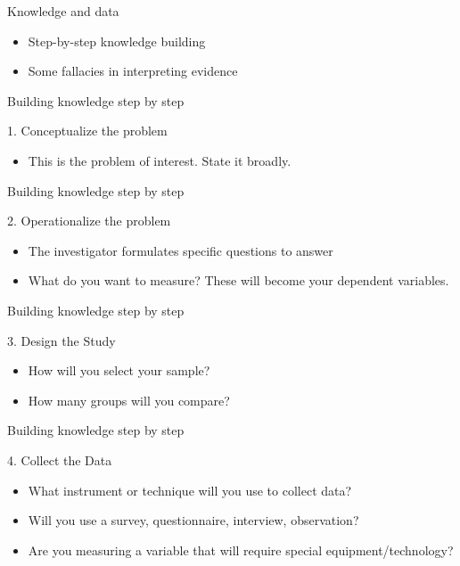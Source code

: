 \documentclass[14pt]{beamer}\usepackage[]{graphicx}\usepackage[]{color}
\begin{document}
\begin{frame}[fragile]{Knowledge and data}

\begin{itemize}
\item Step-by-step knowledge building
\item Some fallacies in interpreting evidence
\end{itemize}
\end{frame}

\begin{frame}[fragile]{Building knowledge step by step}

1. Conceptualize the problem

\begin{itemize}
\item This is the problem of interest.  State it broadly.
\end{itemize}
\end{frame}

\begin{frame}[fragile]{Building knowledge step by step}

2. Operationalize the problem

\begin{itemize}
\item The investigator formulates specific questions to answer
\item What do you want to measure?  These will become your dependent variables.
\end{itemize}
\end{frame}

\begin{frame}[fragile]{Building knowledge step by step}

3. Design the Study

\begin{itemize}
\item How will you select your sample?
\item How many groups will you compare?
\end{itemize}
\end{frame}

\begin{frame}[fragile]{Building knowledge step by step}

4. Collect the Data

\begin{itemize}
\item What instrument or technique will you use to collect data?
\item Will you use a survey, questionnaire, interview, observation?
\item Are you measuring a variable that will require special equipment/technology?
\end{itemize}
\end{frame}
\end{document}
